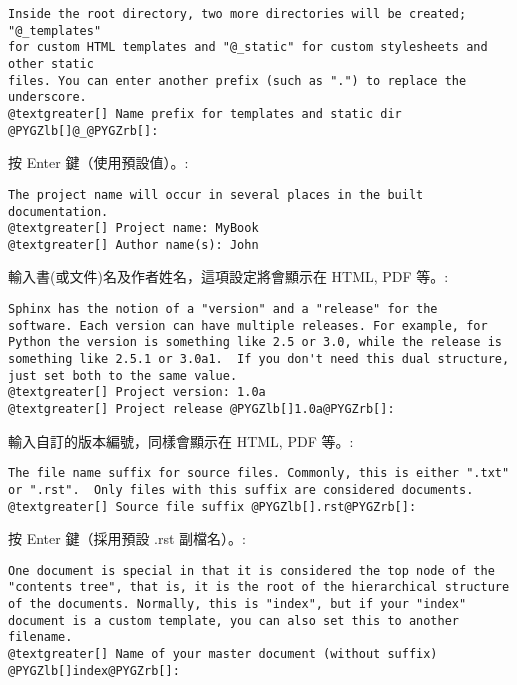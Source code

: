 \documentclass[a4paper,12pt,english]{sphinxmanual}
\begin{document}
\begin{Verbatim}[commandchars=@\[\]]
Inside the root directory, two more directories will be created; "@_templates"
for custom HTML templates and "@_static" for custom stylesheets and other static
files. You can enter another prefix (such as ".") to replace the underscore.
@textgreater[] Name prefix for templates and static dir @PYGZlb[]@_@PYGZrb[]:
\end{Verbatim}

按 Enter 鍵（使用預設值）。:

\begin{Verbatim}[commandchars=@\[\]]
The project name will occur in several places in the built documentation.
@textgreater[] Project name: MyBook
@textgreater[] Author name(s): John
\end{Verbatim}

輸入書(或文件)名及作者姓名，這項設定將會顯示在 HTML, PDF 等。:

\begin{Verbatim}[commandchars=@\[\]]
Sphinx has the notion of a "version" and a "release" for the
software. Each version can have multiple releases. For example, for
Python the version is something like 2.5 or 3.0, while the release is
something like 2.5.1 or 3.0a1.  If you don't need this dual structure,
just set both to the same value.
@textgreater[] Project version: 1.0a
@textgreater[] Project release @PYGZlb[]1.0a@PYGZrb[]:
\end{Verbatim}

輸入自訂的版本編號，同樣會顯示在 HTML, PDF 等。:

\begin{Verbatim}[commandchars=@\[\]]
The file name suffix for source files. Commonly, this is either ".txt"
or ".rst".  Only files with this suffix are considered documents.
@textgreater[] Source file suffix @PYGZlb[].rst@PYGZrb[]:
\end{Verbatim}

按 Enter 鍵（採用預設 .rst 副檔名）。:

\begin{Verbatim}[commandchars=@\[\]]
One document is special in that it is considered the top node of the
"contents tree", that is, it is the root of the hierarchical structure
of the documents. Normally, this is "index", but if your "index"
document is a custom template, you can also set this to another filename.
@textgreater[] Name of your master document (without suffix) @PYGZlb[]index@PYGZrb[]:
\end{Verbatim}
\end{document}
